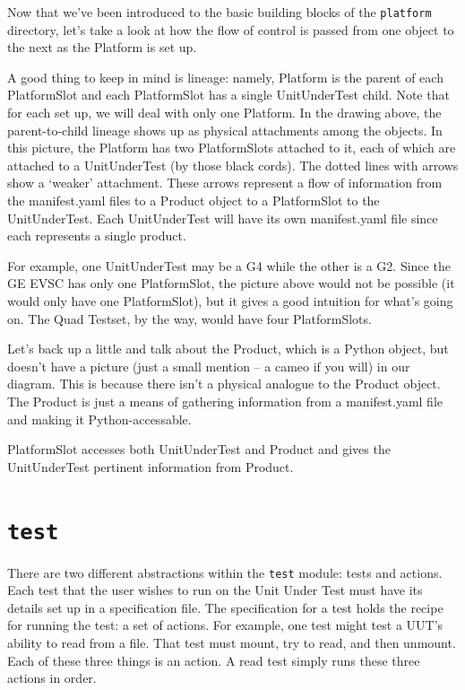 \documentclass{report}
\begin{document}
Now that we've been introduced to the basic building blocks of the \texttt{platform} directory, let's take a look at how the flow of control is passed from one object to the next as the Platform is set up.

A good thing to keep in mind is lineage: namely, Platform is the parent of each PlatformSlot and each PlatformSlot has a single UnitUnderTest child. Note that for each set up, we will deal with only one Platform. In the drawing above, the parent-to-child lineage shows up as physical attachments among the objects. In this picture, the Platform has two PlatformSlots attached to it, each of which are attached to a UnitUnderTest (by those black cords). The dotted lines with arrows show a `weaker' attachment. These arrows represent a flow of information from the manifest.yaml files to a Product object to a PlatformSlot to the UnitUnderTest. Each UnitUnderTest will have its own manifest.yaml file since each represents a single product. 

For example, one UnitUnderTest may be a G4 while the other is a G2. Since the GE EVSC has only one PlatformSlot, the picture above would not be possible (it would only have one PlatformSlot), but it gives a good intuition for what's going on. The Quad Testset, by the way, would have four PlatformSlots.

Let's back up a little and talk about the Product, which is a Python object, but doesn't have a picture (just a small mention -- a cameo if you will) in our diagram. This is because there isn't a physical analogue to the Product object. The Product is just a means of gathering information from a manifest.yaml file and making it Python-accessable. %

PlatformSlot accesses both UnitUnderTest and Product and gives the UnitUnderTest pertinent information from Product.

\section{\texttt{test}}
There are two different abstractions within the \texttt{test} module: tests and actions. Each test that the user wishes to run on the Unit Under Test must have its details set up in a specification file. The specification for a test holds the recipe for running the test: a set of actions. For example, one test might test a UUT's ability to read from a file. That test must mount, try to read, and then unmount. Each of these three things is an action. A read test simply runs these three actions in order.
\end{document}
